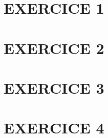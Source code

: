 \documentclass[10pt]{article}
\begin{document}
\section*{EXERCICE 1}


\newpage
\section*{EXERCICE 2}


\newpage
\section*{EXERCICE 3}


\newpage
\section*{EXERCICE 4}

\end{document}
